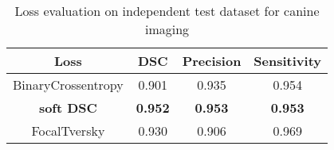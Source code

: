 \begin{table}[h]
\footnotesize
\caption{Loss evaluation on independent test dataset for canine imaging}
\centering
\begin{tabular}{c c c c}
\hline\hline
Loss & DSC & Precision & Sensitivity \\ [0.5ex]
\hline
BinaryCrossentropy & 0.901 & 0.935 & 0.954 \\
\textbf{soft DSC} & \textbf{0.952} & \textbf{0.953} & \textbf{0.953} \\
FocalTversky & 0.930 & 0.906 & 0.969 \\
\hline\hline
\end{tabular}
\label{table:loss_vet}
\end{table}
